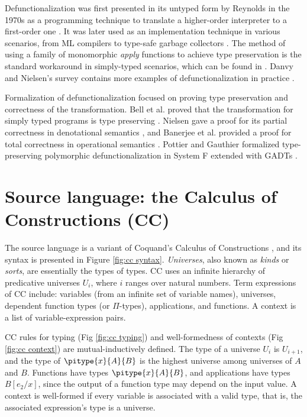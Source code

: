 Defunctionalization was first presented in its untyped form by Reynolds in the 1970s as a programming technique to translate a higher-order interpreter to a first-order one \cite{reynolds1972definitional}. It was later used as an implementation technique in various scenarios, from ML compilers \cite{chin1996higher,cejtin2000flow} to type-safe garbage collectors \cite{wang2001type}. The method of using a family of monomorphic \textit{apply} functions to achieve type preservation is the standard workaround in simply-typed scenarios, which can be found in \cite{bell1997type,tolmach1998ml,cejtin2000flow,nielsen2000denotational}. Danvy and Nielsen’s survey contains more examples of defunctionalization in practice \cite{danvy2001defunctionalization}.


Formalization of defunctionalization focused on proving type preservation and correctness of the transformation. Bell et al. proved that the transformation for simply typed programs is type preserving \cite{bell1997type}.  Nielsen gave a proof for its partial correctness in denotational semantics \cite{nielsen2000denotational}, and Banerjee et al. provided a proof for total correctness in operational semantics \cite{banerjee2001design}. Pottier and Gauthier formalized type-preserving polymorphic defunctionalization in System F extended with GADTs \cite{pottier2004polymorphic}.

\section{Source language: the Calculus of\\ Constructions (CC)}

The source language is a variant of Coquand’s Calculus of Constructions \cite{coquand1986calculus}, and its syntax is presented in Figure \ref{fig:cc syntax}. \textit{Universes}, also known as \textit{kinds} or \textit{sorts}, are essentially the types of types. CC uses an infinite hierarchy of predicative universes $U_i$, where $i$ ranges over natural numbers. Term expressions of CC include: variables (from an infinite set of variable names), universes, dependent function types (or $\Pi$-types), applications, and functions. A context is a list of variable-expression pairs.

CC rules for typing (Fig \ref{fig:cc typing}) and well-formedness of contexts (Fig \ref{fig:cc context}) are mutual-inductively defined. The type of a universe $U_i$ is $U_{i+1}$, and the type of $\pitype{x}{A}{B}$ is the highest universe among universes of $A$ and $B$. Functions have types $\pitype{x}{A}{B}$, and applications have types $B[e_2\slash x]$, since the output of a function type may depend on the input value. A context is well-formed if every variable is associated with a valid type, that is, the associated expression’s type is a universe. 

